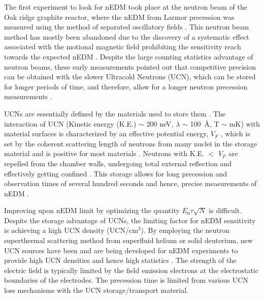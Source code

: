 The first experiment to look for nEDM took place at the neutron beam of the Oak ridge graphite reactor, where the nEDM from Larmor precession was measured using the method of separated oscillatory fields \cite{Ramsey1950, Purcell1950, Smith1957}. This neutron beam method has mostly been abandoned due to the discovery of a systematic effect associated with the motional magnetic field prohibiting the sensitivity reach towards the expected nEDM \cite{Dress1977}. Despite the large counting statistics advantage of neutron beams, these early measurements pointed out that competitive precision can be obtained with the slower Ultracold Neutrons (UCN), which can be stored for longer periods of time, and therefore, allow for a longer neutron precession measurements \cite{Golub1991}.

UCNs are essentially defined by the materials used to store them \cite{Golub1979a, Golub1991}. The interaction of UCN (Kinetic energy (K.E.) $\sim$ 200 neV, $\lambda$ $\sim$ 100~\AA, T $\sim$ mK) with material surfaces is characterized by an effective potential energy, $V_F$ , which is set by the coherent scattering length of neutrons from many nuclei in the storage material and is positive for most materials \cite{Fermi1936, Fermi1947, Golub1979a, Golub1991}. Neutrons with K.E. $<$  $V_F$ are repelled from the chamber walls, undergoing total external reflection and effectively getting confined \cite{Zeldovich1959, Steyerl1969, Lushchikov1969, Golub1979a,  Golub1991}. This storage allows for long precession and observation times of several hundred seconds and hence, precise measurements of nEDM \cite{Golub1991}.

Improving upon nEDM limit by optimizing the quantity $ E_0 \tau \sqrt{N} $ is difficult. Despite the storage advantage of UCNs, the limiting factor for nEDM sensitivity is achieving a high UCN density (UCN/cm$^3$). By employing the neutron superthermal scattering method from superfluid helium or solid deuterium, new UCN sources have been and are being developed for nEDM experiments to provide high UCN densities and hence high statistics \cite{Golub1975, Golub1979a, Golub1991}. The strength of the electric field is typically limited by the field emission electrons at the electrostatic boundaries of the electrodes. The precession time is limited from various UCN loss mechanisms with the UCN storage/transport material.

